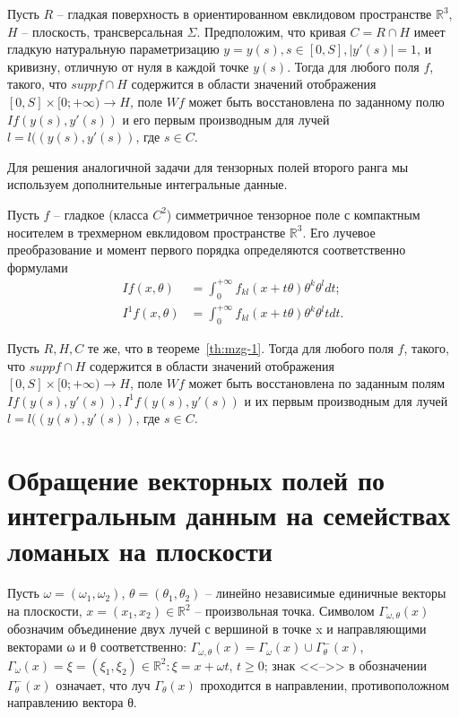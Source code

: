 \begin{theorem}\label{th:mzg-1} 
Пусть $R$ -- гладкая поверхность в ориентированном евклидовом пространстве $\mathbb R^3$, $H$ -- плоскость, трансверсальная $\Sigma$. Предположим, что кривая $C=R\cap H$ имеет гладкую натуральную параметризацию $y=y(s), s\in [0,S],  |y'(s)|=1$, и кривизну, отличную от нуля в каждой точке $y(s)$. Тогда для любого поля $f$, такого, что  
$supp f\cap H$ содержится в области значений отображения $[0,S]\times [0;+\infty)\to H$, поле $Wf$ может быть восстановлена по заданному полю $If(y(s), y'(s))$ и его первым производным для лучей $l=l((y(s), y'(s))$, где $s\in C$.
\end{theorem}

Для решения аналогичной задачи для тензорных полей второго ранга мы используем дополнительные интегральные данные. 

Пусть $f$ -- гладкое (класса $C^2$) симметричное тензорное поле с компактным носителем в трехмерном евклидовом пространстве $\mathbb R^3$. Его лучевое преобразование и момент первого порядка определяются соответственно формулами
\begin{align*}
    If(x,\theta)&=\int_0^{+\infty}f_{kl}(x+t\theta)\theta^k\theta^ldt;
    \\
    I^1f(x,\theta)&=\int_0^{+\infty}f_{kl}(x+t\theta)\theta^k\theta^l tdt.
\end{align*}

\begin{theorem} Пусть $R, H, C$ те же, что в теореме~\ref{th:mzg-1}. Тогда для любого поля $f$, такого, что  
$supp f\cap H$ содержится в области значений отображения $[0,S]\times [0;+\infty)\to H$, поле $Wf$ может быть восстановлена по заданным полям $If(y(s), y'(s)),  I^1f(y(s), y'(s))$ и их первым производным для лучей $l=l((y(s), y'(s))$, где $s\in C$.
\end{theorem}

\section{Обращение векторных полей по интегральным данным на семействах ломаных на плоскости} 

Пусть $ \omega=(\omega_1,\omega_2 )$, $\theta=(\theta_1,\theta_2) $  -- линейно независимые единичные векторы на плоскости, $x=(x_1,x_2 )\in \mathbb R^2$ -- произвольная точка. Символом $\Gamma_{\omega,\theta}(x) $ обозначим объединение двух лучей с вершиной в точке x и направляющими векторами ω и θ соответственно:
$\Gamma_{\omega,\theta}(x)= \Gamma_{\omega}(x)\cup \Gamma_\theta^-(x)$, $\Gamma_{\omega}(x)={\xi=(\xi_1, \xi_2)\in\mathbb R^2: \xi=x+\omega t}$, $t\geq 0$; знак <<-->> в обозначении $\Gamma_\theta^-(x)$ означает, что луч $\Gamma_\theta(x)$ проходится в направлении, противоположном направлению вектора θ.

